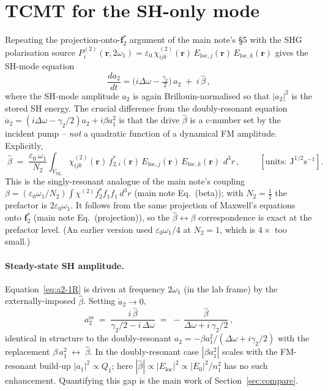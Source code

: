 \documentclass[11pt,a4paper]{article}
\newcommand{\eps}{\varepsilon}
\newcommand{\bvec}[1]{\mathbf{#1}}
\newcommand{\f}{\bvec{f}}
\newcommand{\ri}{\bvec{r}}
\newcommand{\dthreer}{\,d^{3}r}
\newcommand{\chitwo}{\chi^{(2)}}
\newcommand{\Dom}{\Delta\omega}
\newcommand{\VNL}{V_{\text{NL}}}
\begin{document}
\section{TCMT for the SH-only mode}\label{sec:tcmt-1R}

Repeating the projection-onto-$\f_2^{*}$ argument of the main note's \S 5
with the SHG polarisation source
$P_i^{(2)}(\ri,2\omega_1)=\eps_0\,\chitwo_{ijk}(\ri)\,E_{\text{loc},j}(\ri)\,E_{\text{loc},k}(\ri)$
gives the SH-mode equation
\begin{equation}
  \boxed{\;\frac{da_2}{dt}=\bigl(i\Dom-\tfrac{\gamma_2}{2}\bigr)\,a_2
                          \;+\;i\,\hat\beta\,,\;}
  \label{eq:a2-1R}
\end{equation}
where the SH-mode amplitude $a_2$ is again Brillouin-normalised so that
$|a_2|^{2}$ is the stored SH energy.  The crucial difference from the
doubly-resonant equation $\dot a_2=(i\Dom-\gamma_2/2)a_2+i\beta a_1^{2}$ is
that the drive $\hat\beta$ is a c-number set by the incident pump --
\emph{not} a quadratic function of a dynamical FM amplitude.  Explicitly,
\begin{equation}
  \boxed{\;\hat\beta\;=\;\frac{\eps_0\,\omega_1}{N_2}\!\int_{\VNL}\!
                \chitwo_{ijk}(\ri)\,f_{2,i}^{*}(\ri)\,
                E_{\text{loc},j}(\ri)\,E_{\text{loc},k}(\ri)\,\dthreer\,,\;}
  \qquad [\text{units}:\ \mathrm{J}^{1/2}\mathrm{s}^{-1}].
  \label{eq:betahat}
\end{equation}
This is the singly-resonant analogue of the main note's coupling
$\beta=(\eps_0\omega_1/N_2)\!\int\chitwo f_2^{*}f_1 f_1\dthreer$
(main note Eq.~(beta)); with $N_2=\tfrac12$ the prefactor is
$2\eps_0\omega_1$.  It follows from the same projection of Maxwell's
equations onto $\f_2^{*}$ (main note Eq.~(projection)), so the
$\hat\beta\leftrightarrow\beta$ correspondence is exact at the prefactor
level.  (An earlier version used $\eps_0\omega_1/4$ at $N_2=1$, which is
$4\times$ too small.)

\paragraph{Steady-state SH amplitude.}
Equation~\eqref{eq:a2-1R} is driven at frequency $2\omega_1$ (in the lab
frame) by the externally-imposed $\hat\beta$.  Setting $\dot a_2\to 0$,
\begin{equation}
  a_2^{\text{ss}}\;=\;\frac{i\,\hat\beta}{\gamma_2/2-i\,\Dom}
              \;=\;-\,\frac{\hat\beta}{\Dom+i\,\gamma_2/2}\,,
  \label{eq:a2ss-1R}
\end{equation}
identical in structure to the doubly-resonant
$a_2=-\beta a_1^{2}/(\Dom+i\gamma_2/2)$ with the replacement
$\beta\,a_1^{2}\;\longleftrightarrow\;\hat\beta$.  In the doubly-resonant
case $|\beta a_1^{2}|$ scales with the FM-resonant build-up
$|a_1|^{2}\propto Q_1$; here $|\hat\beta|\propto|E_\text{loc}|^{2}\propto
|E_0|^{2}/n_1^{2}$ has no such enhancement.  Quantifying this gap is the
main work of Section~\ref{sec:compare}.
\end{document}
